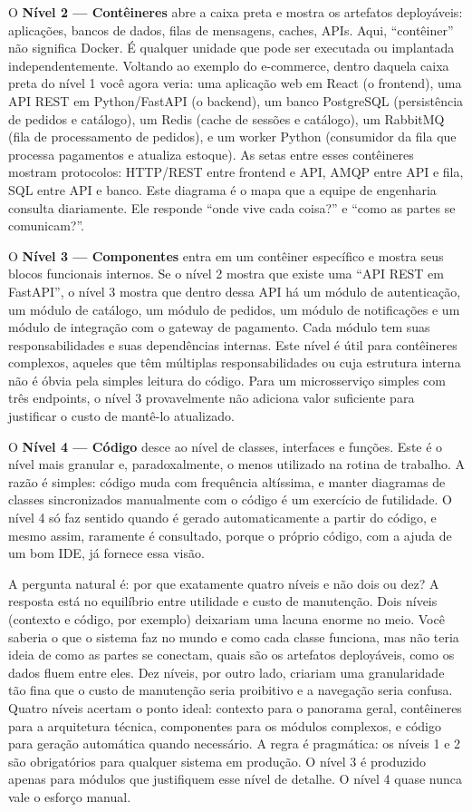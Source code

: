 O \textbf{Nível 2 --- Contêineres} abre a caixa preta e mostra os
artefatos deployáveis: aplicações, bancos de dados, filas de mensagens,
caches, APIs. Aqui, ``contêiner'' não significa Docker. É qualquer
unidade que pode ser executada ou implantada independentemente. Voltando
ao exemplo do e-commerce, dentro daquela caixa preta do nível 1 você
agora veria: uma aplicação web em React (o frontend), uma API REST em
Python/FastAPI (o backend), um banco PostgreSQL (persistência de pedidos
e catálogo), um Redis (cache de sessões e catálogo), um RabbitMQ (fila
de processamento de pedidos), e um worker Python (consumidor da fila que
processa pagamentos e atualiza estoque). As setas entre esses contêineres
mostram protocolos: HTTP/REST entre frontend e API, AMQP entre API e
fila, SQL entre API e banco. Este diagrama é o mapa que a equipe de
engenharia consulta diariamente. Ele responde ``onde vive cada coisa?''
e ``como as partes se comunicam?''.

O \textbf{Nível 3 --- Componentes} entra em um contêiner específico e
mostra seus blocos funcionais internos. Se o nível 2 mostra que existe
uma ``API REST em FastAPI'', o nível 3 mostra que dentro dessa API há um
módulo de autenticação, um módulo de catálogo, um módulo de pedidos, um
módulo de notificações e um módulo de integração com o gateway de
pagamento. Cada módulo tem suas responsabilidades e suas dependências
internas. Este nível é útil para contêineres complexos, aqueles que
têm múltiplas responsabilidades ou cuja estrutura interna não é óbvia
pela simples leitura do código. Para um microsserviço simples com três
endpoints, o nível 3 provavelmente não adiciona valor suficiente para
justificar o custo de mantê-lo atualizado.

O \textbf{Nível 4 --- Código} desce ao nível de classes, interfaces e
funções. Este é o nível mais granular e, paradoxalmente, o menos
utilizado na rotina de trabalho. A razão é simples: código muda com frequência
altíssima, e manter diagramas de classes sincronizados manualmente com o
código é um exercício de futilidade. O nível 4 só faz sentido quando é
gerado automaticamente a partir do código, e mesmo assim, raramente
é consultado, porque o próprio código, com a ajuda de um bom IDE, já
fornece essa visão.

A pergunta natural é: por que exatamente quatro níveis e não dois ou
dez? A resposta está no equilíbrio entre utilidade e custo de
manutenção. Dois níveis (contexto e código, por exemplo) deixariam
uma lacuna enorme no meio. Você saberia o que o sistema faz no mundo e
como cada classe funciona, mas não teria ideia de como as partes se
conectam, quais são os artefatos deployáveis, como os dados fluem entre
eles. Dez níveis, por outro lado, criariam uma granularidade tão fina
que o custo de manutenção seria proibitivo e a navegação seria confusa.
Quatro níveis acertam o ponto ideal: contexto para o panorama geral,
contêineres para a arquitetura técnica, componentes para os módulos
complexos, e código para geração automática quando necessário. A
regra é pragmática: os níveis 1 e 2 são obrigatórios para
qualquer sistema em produção. O nível 3 é produzido apenas para módulos
que justifiquem esse nível de detalhe. O nível 4 quase nunca vale o
esforço manual.

